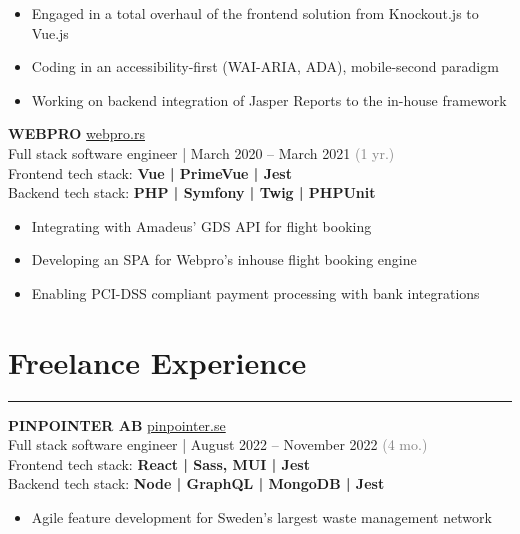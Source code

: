\documentclass[a4paper, 11pt]{article}
\begin{document}
\vspace{-0.2cm}
\begin{itemize}
    \setlength\itemsep{0em}
    \item Engaged in a total overhaul of the frontend solution from Knockout.js to Vue.js
    \item Coding in an accessibility-first (WAI-ARIA, ADA), mobile-second paradigm
    \item Working on backend integration of Jasper Reports to the in-house framework
\end{itemize}
{\fontsize{14pt}{16pt}\selectfont \textbf{WEBPRO} \href{https://webpro.rs}{webpro.rs}} \\
Full stack software engineer | March 2020 – March 2021 \textcolor{gray}{(1 yr.)} \\
Frontend tech stack: \textbf{Vue | PrimeVue | Jest} \\
Backend tech stack: \textbf{PHP | Symfony | Twig | PHPUnit}
\vspace{-0.2cm}
\begin{itemize}
    \setlength\itemsep{0em}
    \item Integrating with Amadeus' GDS API for flight booking
    \item Developing an SPA for Webpro’s inhouse flight booking engine
    \item Enabling PCI-DSS compliant payment processing with bank integrations
\end{itemize}
\vspace{-0.7cm}
\section*{Freelance Experience}
\vspace{-0.3cm}
\hrule
\vspace{0.3cm}
{\fontsize{14pt}{16pt}\selectfont \textbf{PINPOINTER AB} \href{https://pinpointer.se}{pinpointer.se}} \\
Full stack software engineer | August 2022 – November 2022 \textcolor{gray}{(4 mo.)} \\
Frontend tech stack: \textbf{React | Sass, MUI | Jest} \\
Backend tech stack: \textbf{Node | GraphQL | MongoDB | Jest}
\vspace{-0.2cm}
\begin{itemize}
    \setlength\itemsep{0em}
    \item Agile feature development for Sweden’s largest waste management network
\end{itemize}
\vspace{-0.7cm}
\end{document}

